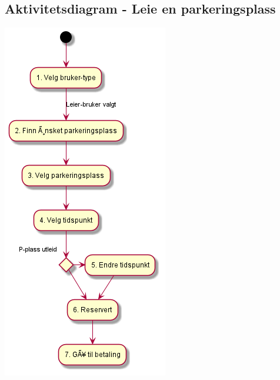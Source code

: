 \documentclass[12pt]{article}
\begin{document}
    \subsection{Aktivitetsdiagram - Leie en parkeringsplass}
    \includegraphics[max width=\textwidth]{bilder/diagrammer/leierAktivitetBestilling.png}
\end{document}
